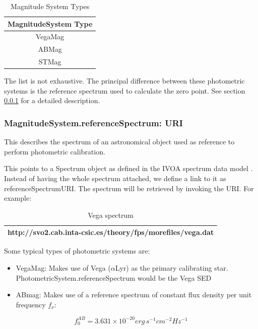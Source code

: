 \documentclass[11pt,a4paper]{ivoa}
\begin{document}


\begin{table}[H]
 			\centering
\begin{tabular}{|c|}
\hline
\bf{MagnitudeSystem Type}\\
\hline
VegaMag\\
\hline
ABMag\\
\hline
STMag\\
\hline
\end{tabular}
\caption{Magnitude System Types}
 \end{table}



The list is not exhaustive. The principal difference between these
photometric systems is the reference spectrum used to calculate the
zero point. See section \ref{referenceSpectrum} for a detailed description.
\par

\subsubsection{MagnitudeSystem.referenceSpectrum: URI} \label{referenceSpectrum}
This describes the spectrum of an astronomical object used as
reference to perform photometric calibration.
\par

This points to a Spectrum object as defined in the IVOA spectrum data
model \citep{2011ivoa.spec.1120M}. Instead of having the whole spectrum
attached, we define a link to it as referenceSpectrumURI.
The spectrum will be retrieved by invoking the URI. For example:
\par


\begin{table}[H]
 			\centering
\begin{tabular}{p{4.42in}}
\hline
http://svo2.cab.inta-csic.es/theory/fps/morefiles/vega.dat \\
\hline
\end{tabular}
\caption{Vega spectrum}
 \end{table}

Some typical types of photometric systems are:
\par

\begin{itemize}
	\item{VegaMag: Makes use of Vega ($\alpha $Lyr) as the primary calibrating
	star. PhotometricSystem.referenceSpectrum would be the Vega SED\par}

	\item{ABmag: Makes use of a reference spectrum of constant flux
	density per unit frequency $f_\nu $:}
\end{itemize}
\begin{equation} \label{eq:31}
f_0^{AB} = 3.631 \times 10^{-20} erg\, s^{-1} cm^{-2} Hz^{-1}
\end{equation}
\end{document}
